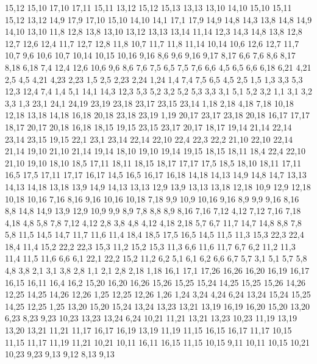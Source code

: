 15,12
%
15,10
17,10
17,11
15,11
%
13,12
15,12
15,13
13,13
%
13,10
14,10
15,10
15,11
15,12
13,12
%
14,9
17,9
17,10
15,10
14,10
%
14,1
17,1
17,9
14,9
14,8
14,3
%
13,8
14,8
14,9
14,10
13,10
%
11,8
12,8
13,8
13,10
13,12
13,13
13,14
11,14
%
12,3
14,3
14,8
13,8
12,8
12,7
12,6
12,4
%
11,7
12,7
12,8
11,8
%
10,7
11,7
11,8
11,14
10,14
%
10,6
12,6
12,7
11,7
10,7
%
9,6
10,6
10,7
10,14
10,15
10,16
9,16
%
8,6
9,6
9,16
9,17
8,17
%
6,6
7,6
8,6
8,17
8,18
6,18
%
7,4
12,4
12,6
10,6
9,6
8,6
7,6
7,5
%
6,5
7,5
7,6
6,6
%
4,5
6,5
6,6
6,18
6,21
4,21
%
2,5
4,5
4,21
4,23
2,23
%
1,5
2,5
2,23
2,24
1,24
%
1,4
7,4
7,5
6,5
4,5
2,5
1,5
%
1,3
3,3
5,3
12,3
12,4
7,4
1,4
%
5,1
14,1
14,3
12,3
5,3
5,2
%
3,2
5,2
5,3
3,3
%
3,1
5,1
5,2
3,2
%
1,1
3,1
3,2
3,3
1,3
23,1
24,1
24,19
23,19
23,18
23,17
23,15
23,14
%
1,18
2,18
4,18
7,18
10,18
12,18
13,18
14,18
16,18
20,18
23,18
23,19
1,19
%
20,17
23,17
23,18
20,18
%
16,17
17,17
18,17
20,17
20,18
16,18
%
18,15
19,15
23,15
23,17
20,17
18,17
%
19,14
21,14
22,14
23,14
23,15
19,15
%
22,1
23,1
23,14
22,14
22,10
22,4
22,3
22,2
%
21,10
22,10
22,14
21,14
%
19,10
21,10
21,14
19,14
%
18,10
19,10
19,14
19,15
18,15
18,11
%
18,4
22,4
22,10
21,10
19,10
18,10
18,5
%
17,11
18,11
18,15
18,17
17,17
%
17,5
18,5
18,10
18,11
17,11
%
16,5
17,5
17,11
17,17
16,17
%
14,5
16,5
16,17
16,18
14,18
14,13
14,9
14,8
14,7
%
13,13
14,13
14,18
13,18
%
13,9
14,9
14,13
13,13
%
12,9
13,9
13,13
13,18
12,18
%
10,9
12,9
12,18
10,18
10,16
%
7,16
8,16
9,16
10,16
10,18
7,18
%
9,9
10,9
10,16
9,16
%
8,9
9,9
9,16
8,16
%
8,8
14,8
14,9
13,9
12,9
10,9
9,9
8,9
%
7,8
8,8
8,9
8,16
7,16
7,12
%
4,12
7,12
7,16
7,18
4,18
%
4,8
5,8
7,8
7,12
4,12
%
2,8
3,8
4,8
4,12
4,18
2,18
%
5,7
6,7
11,7
14,7
14,8
8,8
7,8
5,8
%
11,5
14,5
14,7
11,7
11,6
%
11,4
18,4
18,5
17,5
16,5
14,5
11,5
%
11,3
15,3
22,3
22,4
18,4
11,4
%
15,2
22,2
22,3
15,3
%
11,2
15,2
15,3
11,3
%
6,6
11,6
11,7
6,7
%
6,2
11,2
11,3
11,4
11,5
11,6
6,6
%
6,1
22,1
22,2
15,2
11,2
6,2
%
5,1
6,1
6,2
6,6
6,7
5,7
%
3,1
5,1
5,7
5,8
4,8
3,8
%
2,1
3,1
3,8
2,8
%
1,1
2,1
2,8
2,18
1,18
16,1
17,1
17,26
16,26
16,20
16,19
16,17
16,15
16,11
16,4
16,2
%
15,20
16,20
16,26
15,26
15,25
15,24
%
14,25
15,25
15,26
14,26
%
12,25
14,25
14,26
12,26
%
1,25
12,25
12,26
1,26
%
1,24
3,24
4,24
6,24
13,24
15,24
15,25
14,25
12,25
1,25
%
13,20
15,20
15,24
13,24
13,23
13,21
%
13,19
16,19
16,20
15,20
13,20
%
6,23
8,23
9,23
10,23
13,23
13,24
6,24
%
10,21
11,21
13,21
13,23
10,23
%
11,19
13,19
13,20
13,21
11,21
%
11,17
16,17
16,19
13,19
11,19
%
11,15
16,15
16,17
11,17
%
10,15
11,15
11,17
11,19
11,21
10,21
%
10,11
16,11
16,15
11,15
10,15
%
9,11
10,11
10,15
10,21
10,23
9,23
9,13
9,12
%
8,13
9,13
